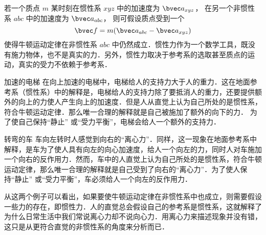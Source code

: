 

若一个质点 $m$ 某时刻在惯性系 $xyz$ 中的加速度为 $\bvec a_{xyz}$， 在另一个非惯性系 $abc$ 中的加速度为 $\bvec a_{abc}$， 则可假设质点受到一个
\begin{equation}\label{Iner_eq1}
\bvec f = m( \bvec a_{abc} - \bvec a_{xyz} )
\end{equation}
使得牛顿运动定律在非惯性系 $abc$ 中仍然成立．惯性力作为一个数学工具，既没有施力物体，也不是真实的力．另外，惯性力取决于参考系的选取甚至质点的运动，真实的受力不依赖于参考系．

\begin{example}{加速的电梯}\label{Iner_ex1}
在向上加速的电梯中，电梯给人的支持力大于人的重力．这在地面参考系（惯性系）中的解释是，电梯给人的支持力除了要抵消人的重力，还要提供额外的向上的力使人产生向上的加速度．但是人从直觉上认为自己所处的是惯性系，符合牛顿运动定律．那么唯一合理的解释就是自己被施加了额外的向下的力． 为了使自己保持“静止” 或“受力平衡”，电梯会给人一个额外的支持力．
\end{example}

\begin{example}{转弯的车}
车向左转时人感觉到向右的“离心力”．同样，这一现象在地面参考系中解释，是车为了使人具有向左的向心加速度，给人一个向左的力，同时人对车施加一个向右的反作用力．然而，车中的人直觉上认为自己所处的是惯性系，符合牛顿运动定律，那么唯一合理的解释就是自己受到了向右的“离心力”．为了使人保持“静止” 或“受力平衡”，车必须给人一个向左的反作用力．
\end{example}

从这两个例子可以看出，如果要使牛顿运动定律在非惯性系中也成立，则需要假设一些力的存在，即惯性力．人的直觉总会假设自己的参考系是惯性系，这就解释了为什么日常生活中我们常说离心力却不说向心力．用离心力来描述现象并没有错，这只是从更符合直觉的非惯性系的角度来分析而已．

